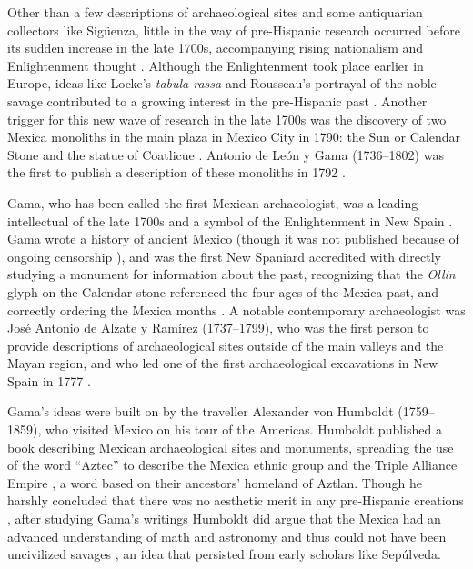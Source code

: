 Other than a few descriptions of archaeological sites and some antiquarian collectors like Sigüenza, little in the way of pre-Hispanic research occurred before its sudden increase in the late 1700s, accompanying rising nationalism and Enlightenment thought \parencite[290]{Lopez2001}.
Although the Enlightenment took place earlier in Europe, 
ideas like Locke’s \emph{tabula rassa} and Rousseau’s portrayal of the noble savage contributed to a growing interest in the pre-Hispanic past \parencite[69,74]{Bernal1980}. 
Another trigger for this new wave of research in the late 1700s was the discovery of two Mexica monoliths in the main plaza in Mexico City in 1790: the Sun or Calendar Stone and the statue of Coatlicue \parencite[18]{Matos1995}. 
Antonio de León y Gama (1736–1802) was the first to publish a description of these monoliths in 1792 \parencite[50]{Villela2010a}.

Gama, who has been called the first Mexican archaeologist, was a leading intellectual of the late 1700s and a symbol of the Enlightenment in New Spain \parencites[80]{Bernal1980}[50]{Villela2010a}. 
Gama wrote a history of ancient Mexico (though it was not published because of ongoing censorship \parencite[51]{Villela2010a}), and was the first New Spaniard accredited with directly studying a monument for information about the past, 
recognizing that the \emph{Ollin} glyph on the Calendar stone referenced the four ages of the Mexica past, and correctly ordering the Mexica months \parencites[84]{Bernal1980}[51-52]{Villela2010a}. 
A notable contemporary archaeologist was José Antonio de Alzate y Ramírez (1737–1799), who was the first person to provide descriptions of archaeological sites outside of the main valleys and the Mayan region, and who led one of the first archaeological excavations in New Spain in 1777 \parencites[79-80]{Bernal1980}[290]{Lopez2001}[50]{Villela2010a}.

Gama’s ideas were built on by the traveller Alexander von Humboldt (1759–1859), who visited Mexico on his tour of the Americas. Humboldt published a book describing Mexican archaeological sites and monuments, spreading the use of the word “Aztec” to describe the Mexica ethnic group and the Triple Alliance Empire \parencites[100]{Bernal1980}[19]{Matos1995}[81-82]{Villela2010b}, 
a word based on their ancestors’ homeland of Aztlan. Though he harshly concluded that there was no aesthetic merit in any pre-Hispanic creations \parencite[23]{Lopez2006}, 
after studying Gama’s writings Humboldt did argue that the Mexica had an advanced understanding of math and astronomy and thus could not have been uncivilized savages \parencite[81-82]{Villela2010b}, an idea that persisted from early scholars like Sepúlveda.

